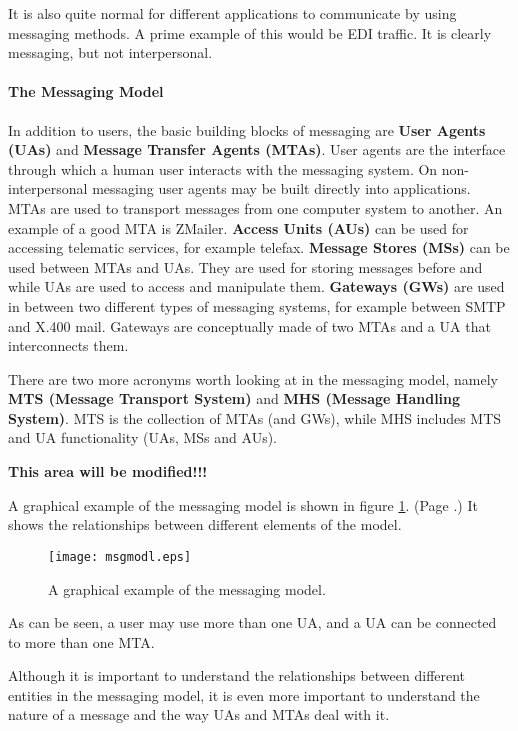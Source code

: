 It is also quite normal for different applications to communicate by using
messaging methods.
A prime example of this would be EDI traffic. It is clearly messaging,
but not interpersonal.



\paragraph{The Messaging Model}

In addition to users, the basic building blocks of messaging are
{\bf User Agents (UAs)} and {\bf Message Transfer Agents (MTAs)}.
User agents are the interface through which a human user interacts with
the messaging system.
On non-interpersonal messaging user agents may be built directly into
applications.
MTAs are used to transport messages from one computer system to another.
An example of a good MTA is ZMailer. 
{\bf Access Units (AUs)} can be used for accessing telematic services,
for example telefax. 
{\bf Message Stores (MSs)} can be used between MTAs and UAs.
They are used for storing messages before and while UAs are used
to access and manipulate them.
{\bf Gateways (GWs)} are used in between two different types
of messaging systems, for example between SMTP and X.400 mail.
Gateways are conceptually made of two MTAs and a UA that interconnects them.

There are two more acronyms worth looking at in the messaging model,
namely {\bf MTS (Message Transport System)} and
{\bf MHS (Message Handling System)}.
MTS is the collection of MTAs (and GWs),
while MHS includes MTS and UA functionality (UAs, MSs and AUs).

{\bf This area will be modified!!!}



A graphical example of the messaging model is shown in figure 
\ref{fig:msgmodl}.
(Page \pageref{fig:msgmodl}.)
It shows the relationships between different elements of the model.

\begin{figure}[ht]
  \centering\texttt{[image: msgmodl.eps]}
  \caption{\label{fig:msgmodl}A graphical example of the messaging model.}
\end{figure}


As can be seen, a user may use more than one UA, and a UA can be connected 
to more than one MTA.

Although it is important to understand the relationships between different 
entities in the messaging model, it is even more important to understand the 
nature of a message and the way UAs and MTAs deal with it.

